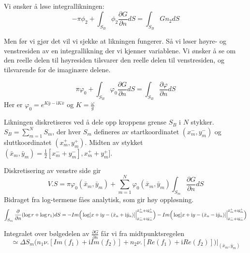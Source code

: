 Vi ønsker å løse integrallikningen:
\begin{equation}
    -\pi \phi_2  + \int_{S_B} \phi_2 \frac{\partial G}{\partial n}  dS = \int_{S_B} G n_2 dS
\end{equation}

Men før vi gjør det vil vi sjekke at likningen fungerer. Så vi løser høyre- og venstresiden av en integrallikning der vi kjenner variablene. Vi ønsker å se om den reelle delen til høyresiden tilsvarer den reelle delen til venstresiden, og tilsvarende for de imaginære delene. 

\begin{equation}
    \pi \varphi_0  + \int_{S_B} \varphi_0 \frac{\partial G}{\partial n}  dS = \int_{S_B} \frac{\partial \varphi}{\partial n}  dS
\end{equation}
Her er $\varphi_0 = e^{K\bar{y} - \textsf{i}  K \bar{x}}$ og $K = \frac{\omega}{g}$

Likningen diskretiseres ved å dele opp kroppens grense $S_B$ i $N$ stykker. $S_B = \sum_{m=1}^{N} S_m$, der hver $S_m$ defineres av startkoordinatet $(x_{m}^{-} , y_{m}^{-})$ og sluttkoordinatet $(x_{m}^{+} , y_{m}^{+})$. Midten av stykket $(\bar{x}_{m} , \bar{y}_{m}) = \frac{1}{2}[x_{m}^{-} + y_{m}^{-}], x_{m}^{+} + y_{m}^{+}]$.

Diskretisering av venstre side gir
\begin{equation}
	V.S = \pi \varphi_0( \bar{x}_{m} , \bar{y}_{m}) + \sum_{m=1}^{N} \varphi_0( \bar{x}_{m}, \bar{y}_{m}) \int_{S_m} \frac{\partial G}{\partial n} dS
\end{equation}
Bidraget fra log-termene fåes analytisk, som gir høy oppløsning.
 \begin{equation}
	\int_{S_m} \frac{\partial}{\partial n}(\log r + \log r_1) dS \\
= -Im\Big( \Big.\log[x + \mathrm{i} y - ( \bar{x}_{n} +\mathrm{i} \bar{y}_{n})]\Big|_{ \bar{x}_{m}^{-} +\mathrm{i} \bar{y}_{m}^{-}}^{ \bar{x}_{m}^{+} +\mathrm{i} \bar{y}_{m}^{+}} \Big) -Im\Big( \Big.\log[x + \mathrm{i} y - ( \bar{x}_{n} -\mathrm{i} \bar{y}_{n})]\Big|_{\bar{x}_{m}^{-} +\mathrm{i} \bar{y}_{m}^{-}}^{\bar{x}_{m}^{+} +\mathrm{i} \bar{y}_{m}^{+}} \Big)
\end{equation}

Integralet over bølgedelen av $\frac{\partial G}{\partial n}$ får vi fra midtpunktsregelen
\begin{equation}
	\simeq \Delta S_m \bigg( n_1 \nu \Big.[ Im(f_1) + \mathrm{i} Im(f_2) ] + n_2 \nu \Big.[ Re(f_1) + \mathrm{i} Re(f_2) ]  \bigg)\Big|_{( \bar{x}_{m} , \bar{y}_{m})}
\end{equation}

